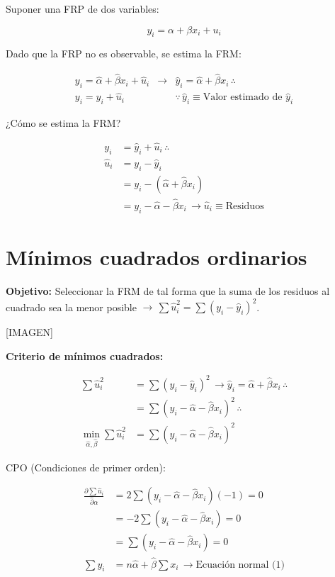 \documentclass[
]{book}
\begin{document}
Suponer una FRP de dos variables:

\[
y_i = \alpha + \beta x_i + u_i
\]

Dado que la FRP no es observable, se estima la FRM:

\[
\begin{array}{ccc}
y_i = \hat \alpha + \hat \beta x_i + \hat u_i & \rightarrow & \hat y_i = \hat \alpha + \hat \beta x_i \, \therefore \\
y_i = \hat y_i + \hat u_i & & \because \, \hat y_i \equiv \text{Valor estimado de } \hat y_i
\end{array}
\]

¿Cómo se estima la FRM?

\[
\begin{aligned}
y_i &= \hat y_i + \hat u_i \, \therefore \\
\hat u_i &= y_i - \hat y_i \\
&= y_i - (\hat \alpha + \hat \beta x_i) \\
&= y_i - \hat \alpha - \hat \beta x_i \, \rightarrow \hat u_i \equiv \text{Residuos}
\end{aligned}
\]

\hypertarget{muxednimos-cuadrados-ordinarios}{%
\section{Mínimos cuadrados ordinarios}\label{muxednimos-cuadrados-ordinarios}}

\textbf{Objetivo:} Seleccionar la FRM de tal forma que la suma de los residuos al cuadrado sea la menor posible \(\rightarrow \, \sum \hat u_i^2 = \sum (y_i - \hat y_i)^2\).

{[}IMAGEN{]}

\textbf{Criterio de mínimos cuadrados:}

\[
\begin{aligned}
\sum \hat u_i^2 &= \sum (y_i - \hat y_i)^2 \, \rightarrow \hat y_i = \hat \alpha + \hat \beta x_i \, \therefore \\
&= \sum(y_i - \hat \alpha - \hat \beta x_i)^2 \, \therefore \\
 \min_{\hat \alpha, \hat \beta} \sum \hat u_i^2 &= \sum(y_i - \hat \alpha - \hat \beta x_i)^2
\end{aligned}
\]

CPO (Condiciones de primer orden):

\[
\begin{aligned}
\frac{ \partial \sum \hat{u}_{i} }{ \hat{\partial} \alpha } &= 2 \sum (y_{i} - \hat{\alpha } - \hat{\beta}x_{i})(-1) = 0  \\
&= -2 \sum (y_{i} - \hat{\alpha } - \hat{\beta}x_{i}) = 0 \\
&= \sum (y_{i} - \hat{\alpha } - \hat{\beta}x_{i}) = 0 \\
\sum y_{i} &= n \hat{\alpha } + \hat{\beta}\sum x_{i} \, \rightarrow \text{Ecuación normal (1)}
\end{aligned}
\]
\end{document}

